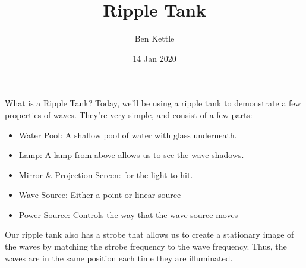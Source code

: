 \documentclass{beamer}
\title{Ripple Tank}
\author{Ben Kettle}
\date{14 Jan 2020}
\begin{document}
 
\frame{\titlepage}

\begin{frame}{What is a Ripple Tank?}
    Today, we'll be using a ripple tank to demonstrate a few properties of waves. They're very simple, and consist of a few parts:
    
    \begin{itemize}
        \item Water Pool: A shallow pool of water with glass underneath.
        \item Lamp: A lamp from above allows us to see the wave shadows.
        \item Mirror $\&$ Projection Screen: for the light to hit.
        \item Wave Source: Either a point or linear source
        \item Power Source: Controls the way that the wave source moves
    \end{itemize}
    
    \vspace{5mm}
    
    Our ripple tank also has a \alert{strobe} that allows us to create a stationary image of the waves by matching the strobe frequency to the wave frequency. Thus, the waves are in the same position each time they are illuminated. 
\end{frame}
\end{document}
